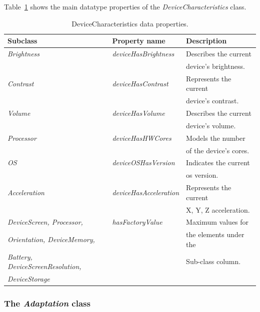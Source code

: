 Table~\ref{tbl:device_characteristics_ontology} shows the main datatype properties
of the \textit{DeviceCharacteristics} class.


\begin{table}
  \caption{DeviceCharacteristics data properties.}
 \label{tbl:device_characteristics_ontology}
\footnotesize
\centering
 \begin{tabular}{l l l}
  \hline 
  \textbf{Subclass} 	& \textbf{Property name} 	& \textbf{Description}		\\
  \hline
  \textit{Brightness}	& \textit{deviceHasBrightness}	& Describes the current		\\
			& 				& device’s brightness.		\\
  \textit{Contrast}	& \textit{deviceHasContrast}	& Represents the current 	\\
  			& 				& device’s contrast.		\\
  \textit{Volume}	& \textit{deviceHasVolume}	& Describes the current		\\
   			& 				& device’s volume.		\\
  \textit{Processor}	& \textit{deviceHasHWCores}	& Models the number 		\\
			& 				& of the device’s cores.	\\
  \textit{OS}		& \textit{deviceOSHasVersion}	& Indicates the current		\\
			& 				& \ac{os} version.		\\
  \textit{Acceleration}	& \textit{deviceHasAcceleration}& Represents the current 	\\
			& 				& X, Y, Z acceleration.		\\
  \textit{DeviceScreen,	Processor,}& \textit{hasFactoryValue}& Maximum values for 	\\
\textit{Orientation, DeviceMemory,}& 			& the elements under the  	\\
\textit{Battery, DeviceScreenResolution,} & 		& Sub-class column.  		\\
\textit{DeviceStorage} 	& 				& 				\\
  \hline

\end{tabular}
\end{table}


\subsubsection{The \textit{Adaptation} class}
\label{sec:adaptation_class}

